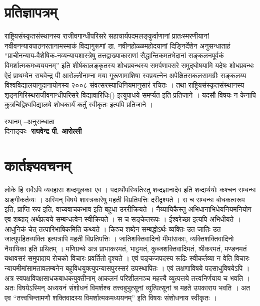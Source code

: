 \chapter{प्रतिज्ञापत्रम्}

राष्ट्रियसंस्कृतसंस्थानस्य राजीवगान्धीपरिसरे सहाचार्यपदमलङ्कुर्वाणानां प्रातःस्मरणीयानां नवीवनन्यायपाठनरतानामस्माकं विद्यागुरूणां डा. नवीनहोळ्ळमहोदयानां दिङ्निर्देशेन अनुसन्धाताहं “प्राचीनन्याय-वैशेषिक-नव्यन्यायशास्त्रेषु तत्तद्वाख्याकाराणां सैद्धान्तिकमतभेदानां सङ्कलनपूर्वकं विमर्शात्मकमध्यययनम्” इति शीर्षकालङ्कृतस्य शोधप्रबन्धस्य समर्पणावसरे समुद्घोषयामि यदेषः शोधप्रबन्धः ऐदं प्राथम्येन राघवेन्द्र पी आरोल्लीनाम्ना  मया गूरूणामाशिषा स्वप्रयत्नेन अपेक्षितसकलसामग्रीः सङ्कलय्य विश्वविद्यालयानुदानायोगस्य २००८ संवत्सरस्याधिनियमानुसारं रचितः । तथा राष्ट्रियसंस्कृतसंस्थानस्य शृङ्गगिरिस्थराजीवगान्धीपरिसरे विद्यावारिधिः() इत्युपाधये समर्प्यत इति प्रतिजाने । यदसौ विषयः न केनापि कुत्रचिद्विश्वविद्यालये शोधकार्यं कर्तुं स्वीकृतः इत्यपि प्रतिजाने ।
\bigskip

\noindent									
स्थानम् –\hfill अनुसन्धाता\\
दिनाङ्कः -\hfill {\large\bfseries राघवेन्द्र पी. आरोल्ली}

\chapter{कार्तज्ञ्यवचनम्}

	लोके हि सर्वेऽपि व्यवहाराः शब्दमूलकाः एव । पदार्थोपस्थितिस्तु शब्दज्ञानादेव इति शब्दार्थयोः कश्चन सम्बन्धः अङ्गीकर्तव्यः । अस्मिन् विषये शास्त्रकारेषु महती विप्रतिपत्तिः दरीदृश्यते । स च सम्बन्धः बोधकत्वरूप इति, प्राप्ति रूप इति, वाच्यवाचकभाव इति बहुधा उररीक्रियते । नैय्यायिकैस्तु अभिधानाभिधेयनियमनियोग एव शब्दाद् अर्थप्रत्यये सम्बन्धत्वेन स्वीक्रियते । स च सङ्केतरूपः । ईश्वरेच्छा इत्यपि अभिधीयते । आधुनिकं चेत् तत्पारिभाषिकमिति कथ्यते । किञ्च शब्देन सम्बद्धोऽर्थः व्यक्तिः उत जातिः उत जात्युपहितव्यक्तिः इत्यत्रापि महती विप्रतिपत्तिः । जातिशक्तिवादिनो मीमांसकाः, व्यक्तिशक्तिवादिनो नैयायिका इति प्रथितम् । मणिग्रन्थे अत्र प्राभाकरमतं, भाट्टमतं, कुब्जशक्तिवादिमतं, श्रीकरमतं, मण्डनमतं यथावसरं समुपादाय रोचको विचारः प्रवर्तितो दृश्यते । एवं पङ्कजपदस्य रूढिः स्वीकर्तव्या न वेति विचारः न्यायमीमांसामतावलम्बनेन बहुविधयुक्त्युपन्यासपुरस्सरं उपस्थापितः । एवं लक्षणाविषये पदसाधुविषयेऽपि । अत्र स्वपक्षविपक्षसाधकबाधकयुक्तीनाम् आकलनं परिशीलनञ्च महत्त्यै व्युत्पत्तये तत्त्वनिर्णयाय च भवति । अतः विषयेऽस्मिन् अध्ययनं संशोधनं विमर्शश्च तत्त्वबुभुत्सूनां व्युत्पित्सूनां च महते उपकाराय भवति । अत एव “तत्त्वचिन्तामणौ शक्तिवादस्य विमर्शात्मकमध्ययनम्” इति विषयः संशोधनाय स्वीकृतः । 




